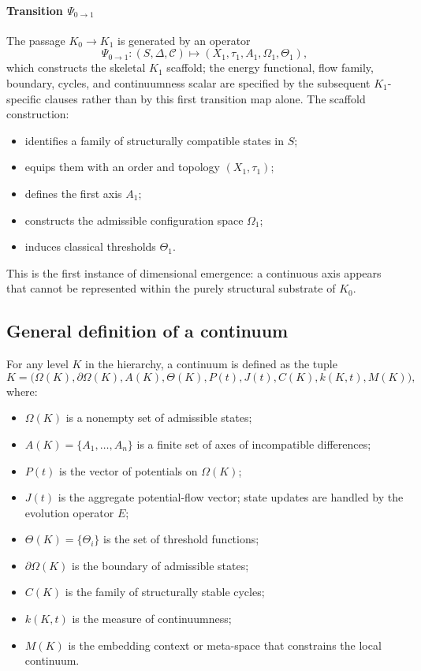 \paragraph{Transition \texorpdfstring{$\Psi_{0\to 1}$}{Psi\_0\_to\_1}}
The passage \(K_0 \to K_1\) is generated by an operator
\[
    \Psi_{0\to 1} : (S,\Delta,\mathcal{C}) \mapsto (X_1,\tau_1,A_1,\Omega_1,\Theta_1),
\]
which constructs the skeletal \(K_1\) scaffold; the energy functional,
flow family, boundary, cycles, and continuumness scalar are specified by the
subsequent \(K_1\)-specific clauses rather than by this first transition map
alone.
The scaffold construction:
\begin{itemize}
    \item identifies a family of structurally compatible states in \(S\);
    \item equips them with an order and topology \((X_1,\tau_1)\);
    \item defines the first axis \(A_1\);
    \item constructs the admissible configuration space \(\Omega_1\);
    \item induces classical thresholds \(\Theta_1\).
\end{itemize}
This is the first instance of dimensional emergence: a continuous axis appears that cannot be represented within the purely structural substrate of \(K_0\).

\subsection{General definition of a continuum}

For any level \(K\) in the hierarchy, a continuum is defined as the tuple
\[
    K = \big(\Omega(K), \partial\Omega(K), A(K), \Theta(K), P(t), J(t), C(K), k(K,t), M(K)\big),
\]
where:
\begin{itemize}
    \item \(\Omega(K)\) is a nonempty set of admissible states;
    \item \(A(K) = \{A_1,\dots,A_n\}\) is a finite set of axes of incompatible differences;
    \item \(P(t)\) is the vector of potentials on \(\Omega(K)\);
    \item \(J(t)\) is the aggregate potential-flow vector; state updates are
          handled by the evolution operator \(E\);
    \item \(\Theta(K) = \{\Theta_i\}\) is the set of threshold functions;
    \item \(\partial\Omega(K)\) is the boundary of admissible states;
    \item \(C(K)\) is the family of structurally stable cycles;
    \item \(k(K,t)\) is the measure of continuumness;
    \item \(M(K)\) is the embedding context or meta-space that constrains the local continuum.
\end{itemize}

